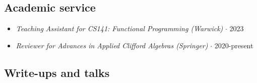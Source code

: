 \documentclass{article}
\begin{document}
\subsection*{Academic service}

\begin{itemize}

    \item \emph{Teaching Assistant for CS141: Functional Programming (Warwick)} $\cdot$ 2023
    
    \item \emph{Reviewer for Advances in Applied Clifford Algebras (Springer)} $\cdot$ 2020-present

\end{itemize}


\subsection*{Write-ups and talks}
\end{document}
